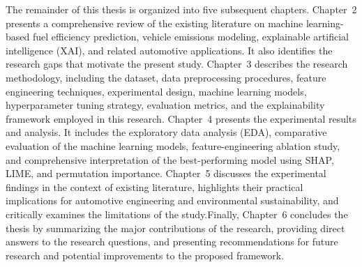 The remainder of this thesis is organized into five subsequent chapters. Chapter~2 presents a comprehensive review of the existing literature on machine learning-based fuel efficiency prediction, vehicle emissions modeling, explainable artificial intelligence (XAI), and related automotive applications. It also identifies the research gaps that motivate the present study.
Chapter~3 describes the research methodology, including the dataset, data preprocessing procedures, feature engineering techniques, experimental design, machine learning models, hyperparameter tuning strategy, evaluation metrics, and the explainability framework employed in this research.
Chapter~4 presents the experimental results and analysis. It includes the exploratory data analysis (EDA), comparative evaluation of the machine learning models, feature-engineering ablation study, and comprehensive interpretation of the best-performing model using SHAP, LIME, and permutation importance.
Chapter~5 discusses the experimental findings in the context of existing literature, highlights their practical implications for automotive engineering and environmental sustainability, and critically examines the limitations of the study.Finally, Chapter~6 concludes the thesis by summarizing the major contributions of the research, providing direct answers to the research questions, and presenting recommendations for future research and potential improvements to the proposed framework.
